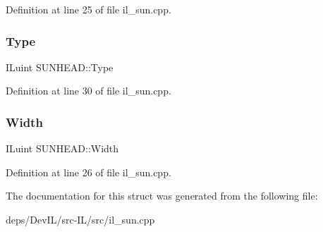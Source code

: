 Definition at line 25 of file il\+\_\+sun.\+cpp.

\mbox{\label{structSUNHEAD_a47416f821dd37691e535ead3ee527626}} 
\subsubsection{\texorpdfstring{Type}{Type}}
{\footnotesize\ttfamily I\+Luint S\+U\+N\+H\+E\+A\+D\+::\+Type}



Definition at line 30 of file il\+\_\+sun.\+cpp.

\mbox{\label{structSUNHEAD_a2750b68d7c59855925e92a84379f8b57}} 
\subsubsection{\texorpdfstring{Width}{Width}}
{\footnotesize\ttfamily I\+Luint S\+U\+N\+H\+E\+A\+D\+::\+Width}



Definition at line 26 of file il\+\_\+sun.\+cpp.



The documentation for this struct was generated from the following file\+:\begin{DoxyCompactItemize}
\item 
deps/\+Dev\+I\+L/src-\/\+I\+L/src/il\+\_\+sun.\+cpp\end{DoxyCompactItemize}
